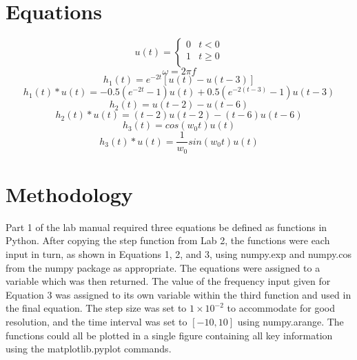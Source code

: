 \documentclass[12pt]{report}
\begin{document}
\section{Equations}

\begin{equation*}
	u(t)=
	\begin{cases}
		0 & t < 0\\
		1 & t\ge 0\\
	\end{cases}
\end{equation*}
\begin{equation*}
	\omega = 2 \pi f
\end{equation*}
\begin{equation}
	h_1(t) = e^{-2t}[u(t) - u(t - 3)]
\end{equation}
\begin{equation*}
	h_1(t) * u(t) =	-0.5(e^{-2t} - 1)u(t) + 0.5(e^{-2(t - 3)} - 1)u(t - 3)
\end{equation*}
\begin{equation}
	h_2(t) = u(t - 2) - u(t - 6) 
\end{equation}
\begin{equation*}
	h_2(t) * u(t) =	(t - 2)u(t - 2) - (t - 6)u(t - 6)
\end{equation*}
\begin{equation}
	h_3(t) = cos(w_0t)u(t)
\end{equation}
\begin{equation*}
	h_3(t) * u(t) =	\frac{1}{w_0} sin(w_0t)u(t)
\end{equation*}
	
\section{Methodology}

Part 1 of the lab manual required three equations be defined as functions in Python. After copying the step function from Lab 2, the functions were each input in turn, as shown in Equations 1, 2, and 3, using numpy.exp and numpy.cos from the numpy package as appropriate. The equations were assigned to a variable which was then returned. The value of the frequency input given for Equation 3 was assigned to its own variable within the third function and used in the final equation. The step size was set to $ 1 \times 10^{-2} $ to accommodate for good resolution, and the time interval was set to $ [-10,10] $ using numpy.arange. The functions could all be plotted in a single figure containing all key information using the matplotlib.pyplot commands. \\
\end{document}

